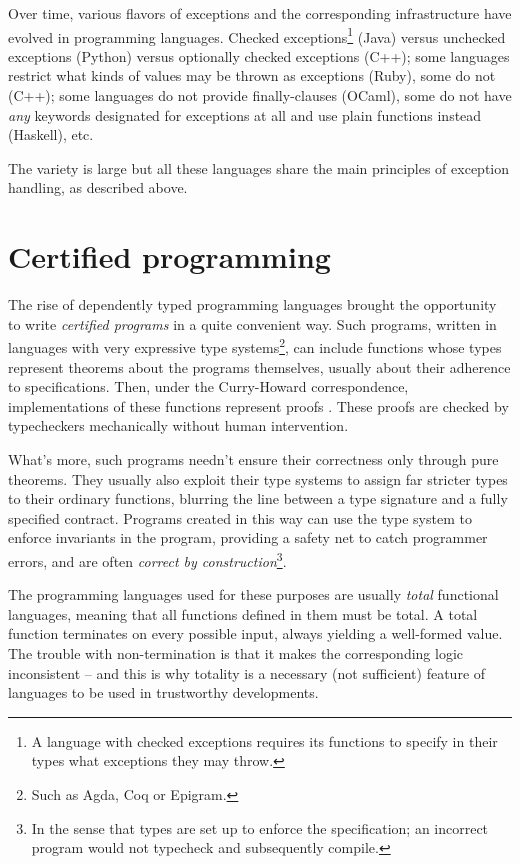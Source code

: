 Over time, various flavors of exceptions and the corresponding infrastructure have evolved
in programming languages. Checked exceptions\footnote{A language with checked exceptions
requires its functions to specify in their types what exceptions they may throw.} (Java)
versus unchecked exceptions (Python) versus optionally checked exceptions (C++); some
languages restrict what kinds of values may be thrown as exceptions (Ruby), some do not (C++);
some languages do not provide finally-clauses (OCaml), some do not have \emph{any}
keywords designated for exceptions at all and use plain functions instead (Haskell), etc.

The variety is large but all these languages share the main principles of exception handling,
as described above.

\section{Certified programming}
\label{sec:intro-certified-programming}

The rise of dependently typed programming languages brought the opportunity to write
\emph{certified programs} in a quite convenient way. Such programs, written in languages
with very expressive type systems\footnote{Such as Agda, Coq or Epigram.}, can include
functions whose types represent theorems
about the programs themselves, usually about their adherence to specifications.
Then, under the Curry-Howard correspondence, implementations of these functions
represent proofs \cite{howard80}. These proofs are checked by typecheckers mechanically
without human intervention.

What's more, such programs needn't ensure their correctness only through pure theorems.
They usually also exploit
their type systems to assign far stricter types to their ordinary functions, blurring the line
between a type signature and a fully specified contract. Programs created in this way
can use the type system to enforce invariants in the program, providing a safety net
to catch programmer errors, and are often \emph{correct by construction}\footnote{In the
sense that types are set up to enforce the specification; an incorrect program would
not typecheck and subsequently compile.}.

The programming languages used for these purposes are usually \emph{total} functional
languages, meaning that all functions defined in them must be total. A total function terminates
on every possible input, always yielding a well-formed value. The trouble with non-termination
is that it makes the corresponding logic inconsistent -- and this is why totality is a necessary
(not sufficient) feature of languages to be used in trustworthy developments.

